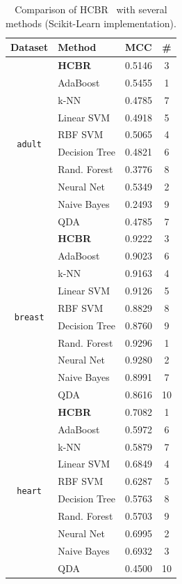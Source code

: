 \documentclass[preprint,12pt]{elsarticle}
\def\HCBR{{\sc HCBR}}
\def\bfHCBR{{\sc \bf HCBR}}
\theoremstyle{definition}
\begin{document}
\begin{table}[h!]

  \caption{Comparison of \HCBR~ with several methods (Scikit-Learn implementation). }
  \begin{minipage}{.5\linewidth}
\fontsize{10pt}{12pt}\selectfont 
\begin{tabular}{|c|l|l|c|}
\hline
 Dataset & Method & MCC & \#  \\ \hline

\multirow{10}{*}{\texttt{adult}} & \bfHCBR & 0.5146 & 3 \\
& AdaBoost & 0.5455  & 1 \\
& k-NN & 0.4785 & 7 \\
& Linear SVM & 0.4918 & 5\\
& RBF SVM & 0.5065 & 4\\
& Decision Tree & 0.4821  & 6\\
& Rand. Forest & 0.3776 & 8 \\
& Neural Net & 0.5349  & 2 \\
& Naive Bayes & 0.2493 & 9\\
& QDA & 0.4785  & 7 \\ \hline

\multirow{10}{*}{\texttt{breast}} & \bfHCBR & 0.9222 & 3 \\
& AdaBoost & 0.9023 & 6\\
& k-NN & 0.9163 & 4\\
& Linear SVM & 0.9126 & 5\\
& RBF SVM & 0.8829 & 8\\
& Decision Tree & 0.8760 & 9\\
& Rand. Forest & 0.9296 & 1\\
& Neural Net & 0.9280 & 2\\
& Naive Bayes & 0.8991 & 7\\
& QDA & 0.8616 & 10\\ \hline

\multirow{10}{*}{\texttt{heart}} & \bfHCBR & 0.7082 & 1 \\
& AdaBoost & 0.5972  & 6\\
& k-NN & 0.5879 & 7\\
& Linear SVM & 0.6849 & 4\\
& RBF SVM & 0.6287 & 5 \\
& Decision Tree & 0.5763  & 8\\
& Rand. Forest &0.5703 & 9\\
& Neural Net & 0.6995 & 2\\
& Naive Bayes & 0.6932 & 3\\
& QDA & 0.4500 & 10 \\ \hline


\end{tabular}
\end{minipage}
\end{table}
\end{document}
